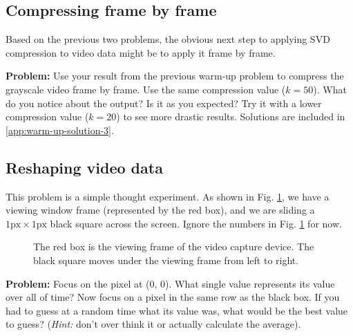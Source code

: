 \subsection{Compressing frame by frame}
Based on the previous two problems, the obvious next step to applying SVD compression to video data might be to apply it frame by frame.

\textbf{Problem:} Use your result from the previous warm-up problem to compress the grayscale video frame by frame. Use the same compression value ($k = 50$). What do you notice about the output? Is it as you expected? Try it with a lower compression value ($k = 20$) to see more drastic results. Solutions are included in \ref{app:warm-up-solution-3}.

\subsection{Reshaping video data}
This problem is a simple thought experiment. As shown in Fig. \ref{fig:warm-up-4-experiment}, we have a viewing window frame (represented by the red box), and we are sliding a $1\text{px} \times 1\text{px}$ black square across the screen. Ignore the numbers in Fig. \ref{fig:warm-up-4-experiment} for now.
\begin{figure}[ht]
	\centering
	\caption{The red box is the viewing frame of the video capture device. The black square moves under the viewing frame from left to right.}
	\label{fig:warm-up-4-experiment}
\end{figure}

\textbf{Problem:} Focus on the pixel at (0, 0). What single value represents its value over all of time? Now focus on a pixel in the same row as the black box. If you had to guess at a random time what its value was, what would be the best value to guess? (\textit{Hint:} don't over think it or actually calculate the average).

